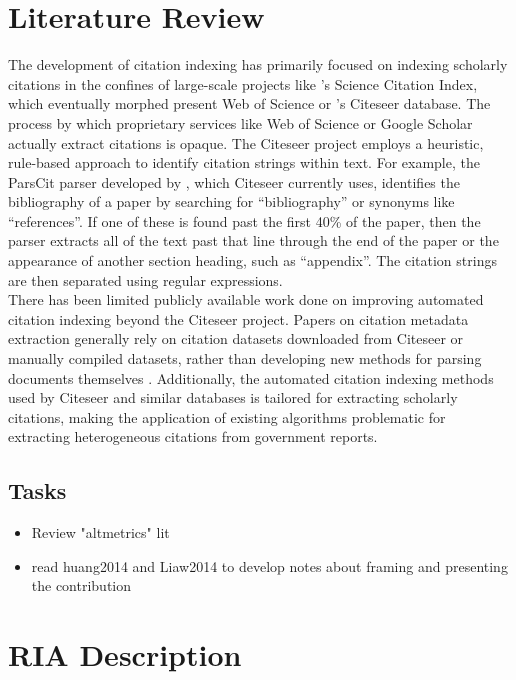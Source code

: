 \documentclass[12pt]{article}
\begin{document}
\section{Literature Review}
The development of citation indexing has primarily focused on indexing scholarly citations in the confines of large-scale projects like 's Science Citation Index, which eventually morphed present Web of Science or 's Citeseer database. The process by which proprietary services like Web of Science or Google Scholar actually extract citations is opaque. The Citeseer project employs a heuristic, rule-based approach to identify citation strings within text. For example, the ParsCit parser developed by , which Citeseer currently uses, identifies the bibliography of a paper by searching for ``bibliography'' or synonyms like ``references''. If one of these is found past the first 40\% of the paper, then the parser extracts all of the text past that line through the end of the paper or the appearance of another section heading, such as ``appendix''. The citation strings are then separated using regular expressions. \\

There has been limited publicly available work done on improving automated citation indexing beyond the Citeseer project. Papers on citation metadata extraction generally rely on citation datasets downloaded from Citeseer or manually compiled datasets, rather than developing new methods for parsing documents themselves \cite{anzaroot2013}. Additionally, the automated citation indexing methods used by Citeseer and similar databases is tailored for extracting scholarly citations, making the application of existing algorithms problematic for extracting heterogeneous citations from government reports.\\

\subsection{Tasks}

\begin{itemize}
\item Review "altmetrics" lit
\item  read huang2014 and Liaw2014 to develop notes about framing and presenting the contribution
\end{itemize}

\section{RIA Description}
\end{document}
